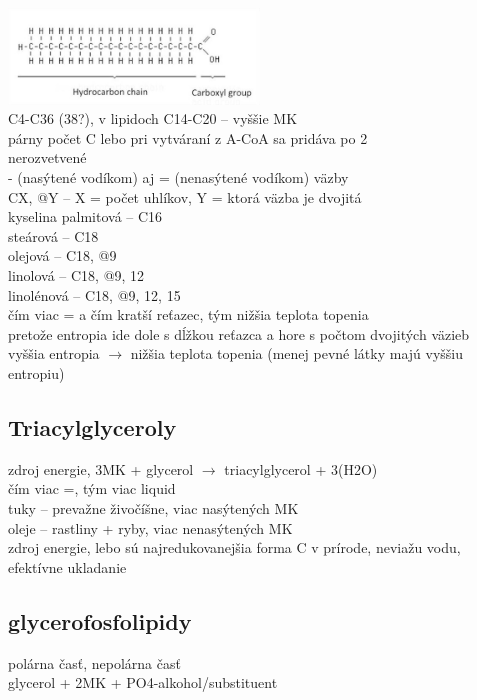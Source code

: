 \includegraphics[width=0.5\textwidth]{images/fatty_acid}
\\
C4-C36 (38?), v lipidoch C14-C20 -- vyššie MK\\
párny počet C lebo pri vytváraní z A-CoA sa pridáva po 2\\
nerozvetvené\\
- (nasýtené vodíkom) aj = (nenasýtené vodíkom) väzby\\
CX, @Y -- X = počet uhlíkov, Y = ktorá väzba je dvojitá\\
\tab kyselina palmitová -- C16\\
\tab steárová -- C18\\
\tab olejová -- C18, @9\\
\tab linolová -- C18, @9, 12 \\
\tab linolénová -- C18, @9, 12, 15\\
čím viac = a čím kratší reťazec, tým nižšia teplota topenia\\
\tab pretože entropia ide dole s dĺžkou reťazca a hore s počtom dvojitých väzieb\\
\tab vyššia entropia $\rightarrow$ nižšia teplota topenia (menej pevné látky majú vyššiu entropiu)\\
\subsection{Triacylglyceroly}
zdroj energie, 3MK + glycerol $\rightarrow$ triacylglycerol + 3(H2O)\\
čím viac =, tým viac liquid\\
tuky -- prevažne živočíšne, viac nasýtených MK\\
oleje -- rastliny + ryby, viac nenasýtených MK\\
zdroj energie, lebo sú najredukovanejšia forma C v prírode, neviažu vodu, efektívne ukladanie\\
\subsection{glycerofosfolipidy}
polárna časť, nepolárna časť\\
glycerol + 2MK + PO4-alkohol/substituent\\

